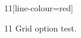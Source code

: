 \documentclass[paper=A4]{ropas-poster}
\begin{document}
\begin{postergrid}{1}{1}[line-colour=red]
\begin{posterblock}{1}{1}
Grid option test.
\end{posterblock}
\end{postergrid}
\end{document}
